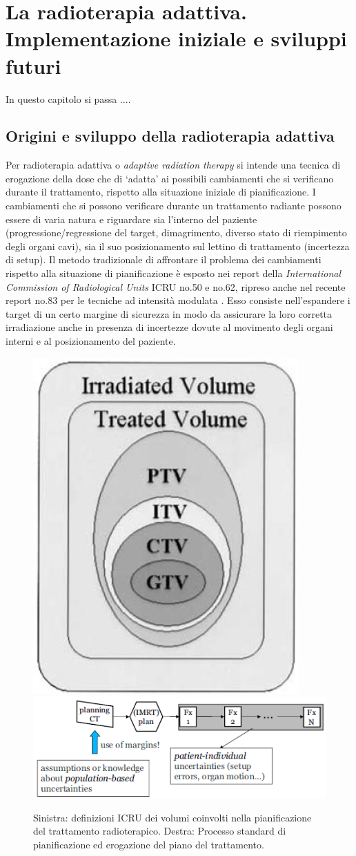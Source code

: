 \chapter{La radioterapia adattiva. Implementazione iniziale e sviluppi futuri}
\minitoc
\textsf{In questo capitolo si passa ....}

\section{Origini e sviluppo della radioterapia adattiva}
Per radioterapia adattiva o \textit{adaptive radiation therapy} si intende una tecnica di erogazione della dose che di `adatta' ai possibili cambiamenti che si verificano durante il trattamento, rispetto alla situazione iniziale di pianificazione. I cambiamenti che si possono verificare durante un trattamento radiante possono essere di varia natura e riguardare sia l'interno del paziente (progressione/regressione del target, dimagrimento, diverso stato di riempimento degli organi cavi), sia il suo  posizionamento sul lettino di trattamento (incertezza di setup). Il metodo tradizionale di affrontare il problema dei cambiamenti rispetto alla situazione di pianificazione è esposto nei report della \textit{International Commission of Radiological Units} ICRU no.50 e no.62, ripreso anche nel recente report no.83 per le tecniche ad intensità modulata \cite{ICRU2010}. Esso consiste nell'espandere i target di un certo margine di sicurezza in modo da assicurare la loro corretta irradiazione anche in presenza di incertezze dovute al movimento degli organi interni e al posizionamento del paziente.
\begin{figure}
\centering
\includegraphics[width=.3\textwidth]{./cap3/ptv.png}
\includegraphics[width=.69\textwidth]{./cap3/adapt0.png}
\caption{Sinistra: definizioni ICRU dei volumi coinvolti nella pianificazione del trattamento radioterapico. Destra: Processo standard di pianificazione ed erogazione del piano del trattamento.}
\label{fig:adapt0}
\end{figure}

